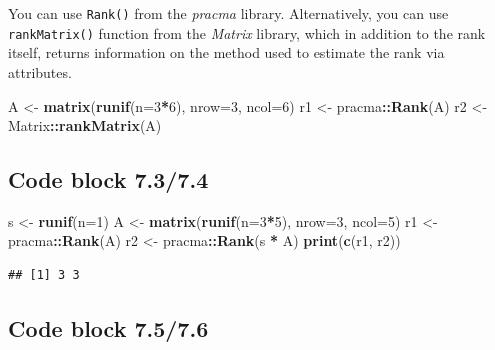 \documentclass[
]{book}
\newenvironment{Shaded}{\begin{snugshade}}{\end{snugshade}}
\newcommand{\DataTypeTok}[1]{\textcolor[rgb]{0.13,0.29,0.53}{#1}}
\newcommand{\DecValTok}[1]{\textcolor[rgb]{0.00,0.00,0.81}{#1}}
\newcommand{\KeywordTok}[1]{\textcolor[rgb]{0.13,0.29,0.53}{\textbf{#1}}}
\newcommand{\NormalTok}[1]{#1}
\newcommand{\OperatorTok}[1]{\textcolor[rgb]{0.81,0.36,0.00}{\textbf{#1}}}
\newcommand{\StringTok}[1]{\textcolor[rgb]{0.31,0.60,0.02}{#1}}
\begin{document}
You can use \texttt{Rank()} from the \emph{pracma} library. Alternatively, you can use \texttt{rankMatrix()} function from the \emph{Matrix} library, which in addition to the rank itself, returns information on the method used to estimate the rank via attributes.

\begin{Shaded}
\begin{Highlighting}[]
\NormalTok{A \textless{}{-}}\StringTok{ }\KeywordTok{matrix}\NormalTok{(}\KeywordTok{runif}\NormalTok{(}\DataTypeTok{n=}\DecValTok{3}\OperatorTok{*}\DecValTok{6}\NormalTok{), }\DataTypeTok{nrow=}\DecValTok{3}\NormalTok{, }\DataTypeTok{ncol=}\DecValTok{6}\NormalTok{)}
\NormalTok{r1 \textless{}{-}}\StringTok{ }\NormalTok{pracma}\OperatorTok{::}\KeywordTok{Rank}\NormalTok{(A)}
\NormalTok{r2 \textless{}{-}}\StringTok{ }\NormalTok{Matrix}\OperatorTok{::}\KeywordTok{rankMatrix}\NormalTok{(A)}
\end{Highlighting}
\end{Shaded}

\hypertarget{code-block-7.37.4}{%
\subsection*{Code block 7.3/7.4}\label{code-block-7.37.4}}

\begin{Shaded}
\begin{Highlighting}[]
\NormalTok{s \textless{}{-}}\StringTok{ }\KeywordTok{runif}\NormalTok{(}\DataTypeTok{n=}\DecValTok{1}\NormalTok{)}
\NormalTok{A \textless{}{-}}\StringTok{ }\KeywordTok{matrix}\NormalTok{(}\KeywordTok{runif}\NormalTok{(}\DataTypeTok{n=}\DecValTok{3}\OperatorTok{*}\DecValTok{5}\NormalTok{), }\DataTypeTok{nrow=}\DecValTok{3}\NormalTok{, }\DataTypeTok{ncol=}\DecValTok{5}\NormalTok{)}
\NormalTok{r1 \textless{}{-}}\StringTok{ }\NormalTok{pracma}\OperatorTok{::}\KeywordTok{Rank}\NormalTok{(A)}
\NormalTok{r2 \textless{}{-}}\StringTok{ }\NormalTok{pracma}\OperatorTok{::}\KeywordTok{Rank}\NormalTok{(s }\OperatorTok{*}\StringTok{ }\NormalTok{A)}
\KeywordTok{print}\NormalTok{(}\KeywordTok{c}\NormalTok{(r1, r2))}
\end{Highlighting}
\end{Shaded}

\begin{verbatim}
## [1] 3 3
\end{verbatim}

\hypertarget{code-block-7.57.6}{%
\subsection*{Code block 7.5/7.6}\label{code-block-7.57.6}}
\end{document}
